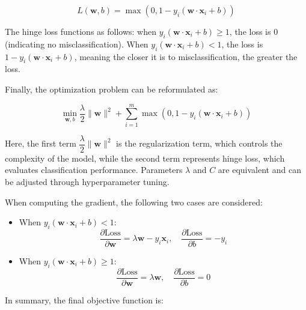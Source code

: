 \documentclass[a4paper, utf8]{ctexart}
\begin{document}
	\vspace{-.75em}
	\begin{equation}
		L(\boldsymbol{w}, b) = \max(0, 1 - y_i (\boldsymbol{w} \cdot \boldsymbol{x}_i + b))
	\end{equation}
	
	The hinge loss functions as follows: when $y_i (\boldsymbol{w} \cdot \boldsymbol{x}_i + b) \geq 1$, the loss is 0 (indicating no misclassification). When $y_i (\boldsymbol{w} \cdot \boldsymbol{x}_i + b) < 1$, the loss is $1 - y_i (\boldsymbol{w} \cdot \boldsymbol{x}_i + b)$, meaning the closer it is to misclassification, the greater the loss.
	
	Finally, the optimization problem can be reformulated as:
	
	\vspace{-.75em}
	\begin{equation}
		\min_{\boldsymbol{w}, b} \frac{\lambda}{2} \|\boldsymbol{w}\|^2 + \sum_{i=1}^m \max(0, 1 - y_i (\boldsymbol{w} \cdot \boldsymbol{x}_i + b))
	\end{equation}
	
	Here, the first term $\dfrac{\lambda}{2} \|\boldsymbol{w}\|^2$ is the regularization term, which controls the complexity of the model, while the second term represents hinge loss, which evaluates classification performance. Parameters $\lambda$ and $C$ are equivalent and can be adjusted through hyperparameter tuning.
	
	When computing the gradient, the following two cases are considered:
	
	\begin{itemize}[itemsep=4pt, topsep=2pt, parsep=2pt]
		\item When $y_i (\boldsymbol{w} \cdot \boldsymbol{x}_i + b) < 1$:
		\begin{equation}
			\frac{\partial \text{Loss}}{\partial \boldsymbol{w}} = \lambda \boldsymbol{w} - y_i \boldsymbol{x}_i, \quad \frac{\partial \text{Loss}}{\partial b} = -y_i
		\end{equation}
		\item When $y_i (\boldsymbol{w} \cdot \boldsymbol{x}_i + b) \geq 1$:
		\begin{equation}
			\frac{\partial \text{Loss}}{\partial \boldsymbol{w}} = \lambda \boldsymbol{w}, \quad \frac{\partial \text{Loss}}{\partial b} = 0
		\end{equation}
	\end{itemize}
	
	In summary, the final objective function is:
	
\end{document}
